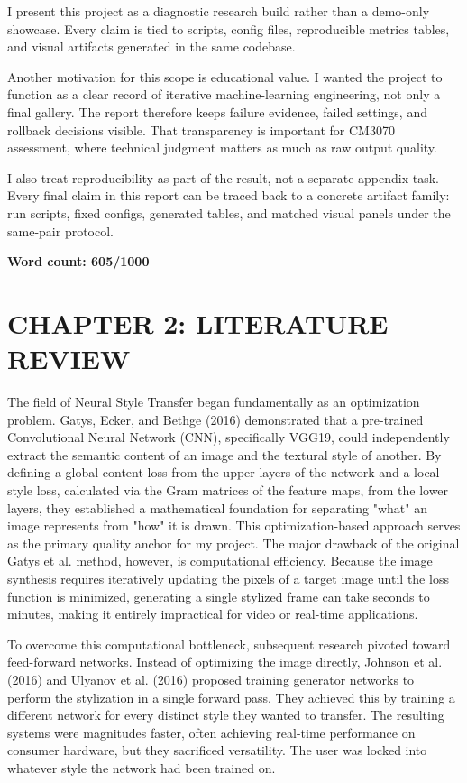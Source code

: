 \documentclass[12pt,letterpaper]{article}
\begin{document}
I present this project as a diagnostic research build rather than a demo-only showcase. Every claim is tied to scripts, config files, reproducible metrics tables, and visual artifacts generated in the same codebase.

Another motivation for this scope is educational value. I wanted the project to function as a clear record of iterative machine-learning engineering, not only a final gallery. The report therefore keeps failure evidence, failed settings, and rollback decisions visible. That transparency is important for CM3070 assessment, where technical judgment matters as much as raw output quality.

I also treat reproducibility as part of the result, not a separate appendix task. Every final claim in this report can be traced back to a concrete artifact family: run scripts, fixed configs, generated tables, and matched visual panels under the same-pair protocol.

\textbf{Word count: 605/1000}

\setcounter{section}{2}
\setcounter{subsection}{0}
\section*{CHAPTER 2: LITERATURE REVIEW}
The field of Neural Style Transfer began fundamentally as an optimization problem. Gatys, Ecker, and Bethge (2016) \cite{gatys2016} demonstrated that a pre-trained Convolutional Neural Network (CNN), specifically VGG19, could independently extract the semantic content of an image and the textural style of another. By defining a global content loss from the upper layers of the network and a local style loss, calculated via the Gram matrices of the feature maps, from the lower layers, they established a mathematical foundation for separating "what" an image represents from "how" it is drawn. This optimization-based approach serves as the primary quality anchor for my project. The major drawback of the original Gatys et al. method, however, is computational efficiency. Because the image synthesis requires iteratively updating the pixels of a target image until the loss function is minimized, generating a single stylized frame can take seconds to minutes, making it entirely impractical for video or real-time applications.

To overcome this computational bottleneck, subsequent research pivoted toward feed-forward networks. Instead of optimizing the image directly, Johnson et al. (2016) \cite{johnson2016} and Ulyanov et al. (2016) \cite{ulyanov2016} proposed training generator networks to perform the stylization in a single forward pass. They achieved this by training a different network for every distinct style they wanted to transfer. The resulting systems were magnitudes faster, often achieving real-time performance on consumer hardware, but they sacrificed versatility. The user was locked into whatever style the network had been trained on.
\end{document}
